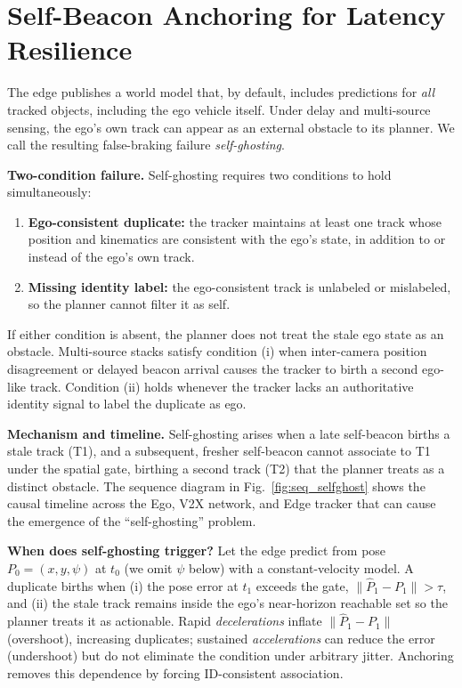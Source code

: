 \section{Self-Beacon Anchoring for Latency Resilience}
\label{sec:beacon}



The edge publishes a world model that, by default, includes predictions for \textit{all} tracked objects, including the ego vehicle itself. Under delay and multi-source sensing, the ego's own track can appear as an external obstacle to its planner. We call the resulting false-braking failure \emph{self-ghosting}.

\textbf{Two-condition failure.}
Self-ghosting requires two conditions to hold simultaneously:
\begin{enumerate}[label=(\roman*),noitemsep,topsep=0pt,leftmargin=1.2\parindent]
\item \textbf{Ego-consistent duplicate:} the tracker maintains at least one track whose position and kinematics are consistent with the ego's state, in addition to or instead of the ego's own track.
\item \textbf{Missing identity label:} the ego-consistent track is unlabeled or mislabeled, so the planner cannot filter it as self.
\end{enumerate}
If either condition is absent, the planner does not treat the stale ego state as an obstacle. Multi-source stacks satisfy condition (i) when inter-camera position disagreement or delayed beacon arrival causes the tracker to birth a second ego-like track. Condition (ii) holds whenever the tracker lacks an authoritative identity signal to label the duplicate as ego.

\textbf{Mechanism and timeline.}
Self-ghosting arises when a late self-beacon births a stale track (T1), and a subsequent, fresher self-beacon cannot associate to T1 under the spatial gate, birthing a second track (T2) that the planner treats as a distinct obstacle. The sequence diagram in Fig.~\ref{fig:seq_selfghost} shows the causal timeline across the Ego, V2X network, and Edge tracker that can cause the emergence of the ``self-ghosting'' problem.




\textbf{When does self-ghosting trigger?}
Let the edge predict from pose $P_0=(x,y,\psi)$ at $t_0$ (we omit $\psi$ below) with a constant-velocity model. A duplicate births when (i) the pose error at $t_1$ exceeds the gate, $\|\hat P_1-P_1\|>\tau$, and (ii) the stale track remains inside the ego's near-horizon reachable set so the planner treats it as actionable. Rapid \emph{decelerations} inflate $\|\hat P_1-P_1\|$ (overshoot), increasing duplicates; sustained \emph{accelerations} can reduce the error (undershoot) but do not eliminate the condition under arbitrary jitter. Anchoring removes this dependence by forcing ID-consistent association.

